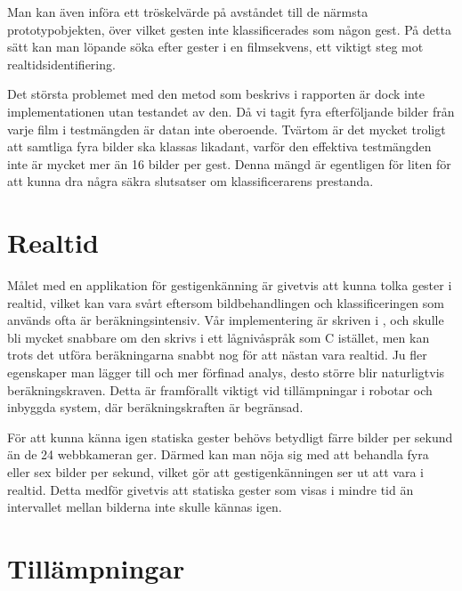 \documentclass[../rapport_MVEX01-11-05]{subfiles}
\begin{document}
Man kan även införa ett tröskelvärde på avståndet till de närmsta
prototypobjekten, över vilket gesten inte klassificerades som någon
gest. På detta sätt kan man löpande söka efter gester
i en filmsekvens, ett viktigt steg mot
realtidsidentifiering.

Det största problemet med den metod som beskrivs i rapporten är dock
inte implementationen utan testandet av den. Då vi tagit fyra
efterföljande bilder
från varje film i testmängden är datan inte oberoende. Tvärtom är det
mycket troligt att samtliga fyra bilder ska klassas likadant, varför
den effektiva testmängden inte är mycket mer än 16 bilder per
gest. Denna mängd är egentligen för liten för att kunna dra några
säkra slutsatser om klassificerarens prestanda.

\section{Realtid}
Målet med en applikation för gestigenkänning är givetvis att kunna tolka
gester i realtid, vilket kan vara svårt eftersom bildbehandlingen och
klassificeringen som används ofta är beräkningsintensiv. Vår implementering
är skriven i \MATLAB, och skulle bli mycket snabbare om den
skrivs i ett lågnivåspråk som C istället, men kan trots det utföra
beräkningarna snabbt nog för att nästan vara realtid.
Ju fler egenskaper man lägger till och mer förfinad analys, desto
större blir naturligtvis beräkningskraven. Detta är framförallt
viktigt vid tillämpningar i robotar och inbyggda system, där beräkningskraften
är begränsad.

För att kunna känna igen statiska gester behövs betydligt färre bilder per
sekund än de 24 webbkameran ger. Därmed kan man nöja sig med
att behandla fyra eller sex bilder per
sekund, vilket gör att gestigenkänningen ser ut att vara i realtid.
Detta medför givetvis att statiska gester som visas i mindre tid
än intervallet mellan bilderna inte skulle kännas igen.


\section{Tillämpningar}

\end{document}
